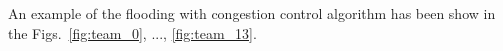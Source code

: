 \begin{figure*}
   \caption{A team has been created with a
  single monitor $M_0$ ($[\mathtt{hello}]$ messages are not
  shown. Chunks with numbers 0 and 1 have been transmitted from the
  splitter $S$ to $M_0$. \label{fig:team_0}}
\end{figure*}

An example of the flooding with congestion control algorithm has been
show in the Figs.~\ref{fig:team_0}, ..., \ref{fig:team_13}.

\begin{comment}
In each round, peers check if a chunk have been received from the rest
of peers of the team (${\cal P}_k\in {\cal T}_j)$). If not, peers send
a $[\mathtt{propagate}~{\cal P}_i]$ to one or more (possibly
to the rest of) peers of the team, where ${\cal P}_i$ is the origin peer
of the missing chunk. At this point, the process continues as
described in Section~\ref{dbs:chunk_flooding}.
\end{comment}

\begin{comment}
For each ${\cal P}_k\in N({\cal P}_i)$, ${\cal P}_i$ checks if a chunk
has been received from ${\cal P}_k$. If ${\cal P}_i$ detects that
${\cal P}_k$ has not sent a chunk to it during $L$ consecutive rounds,
performs $N({\cal P}_i) = N({\cal P}_i)\setminus{\cal P}_k$, and stops
sending to ${\cal P}_k$ more chunks.
\end{comment}
\begin{comment}
computes a
``chunk-debt'', denoted by $d({\cal P}_k)$, that is incremented each
time a chunk is received from ${\cal P}_k$ and decremented each time a
chunk is sent to ${\cal P}_k$. If ${\cal P}_i$ verifies that $d({\cal
  P}_k)>D$ (the maximum debt), then ${\cal P}_i$ considers that ${\cal
  P}_k$ is unable to communicate with it, performs $N({\cal P}_i) =
N({\cal P}_i)\setminus{\cal P}_k$, and stops sending to ${\cal P}_k$
more chunks.
\end{comment}




